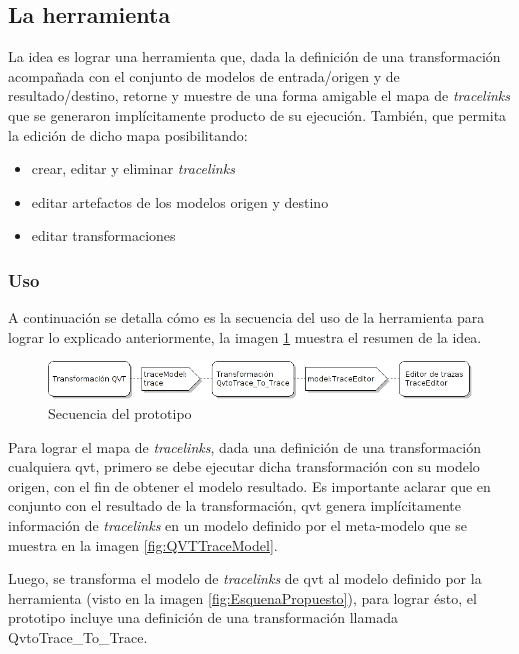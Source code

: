 \documentclass[a4paper,12pt,oneside,spanish]{book}
\begin{document}
\subsection{La herramienta}

La idea es lograr una herramienta que, dada la definición de una transformación acompañada con el conjunto de modelos de entrada/origen y de resultado/destino, retorne y muestre de una forma amigable el mapa de \textit{tracelinks} que se generaron implícitamente producto de su ejecución. También, que permita la edición de dicho mapa posibilitando:
\begin{itemize}
\item crear, editar y eliminar \textit{tracelinks}
\item editar artefactos de los modelos origen y destino
\item editar transformaciones
\end{itemize}


\subsubsection{Uso}

A continuación se detalla cómo es la secuencia del uso de la herramienta para lograr lo explicado anteriormente, la imagen \ref{fig:SecuenciaPrototipo} muestra el resumen de la idea.

\bigskip

\begin{figure}[hbtp]
\centering
\includegraphics[scale=.56]{./img/Secuencia_Prototipo}
\caption{Secuencia del prototipo}
\label{fig:SecuenciaPrototipo}
\end{figure}

\bigskip

Para lograr el mapa de \textit{tracelinks}, dada una definición de una transformación cualquiera \gls{qvt}, primero se debe ejecutar dicha transformación con su modelo origen, con el fin de obtener el modelo resultado. Es importante aclarar que en conjunto con el resultado de la transformación, \gls{qvt} genera implícitamente información de \textit{tracelinks} en un modelo definido por el meta-modelo que se muestra en la imagen \ref{fig:QVTTraceModel}. 

Luego, se transforma el modelo de \textit{tracelinks} de \gls{qvt} al modelo definido por la herramienta (visto en la imagen \ref{fig:EsquenaPropuesto}), para lograr ésto, el prototipo incluye una definición de una transformación llamada \textsf{QvtoTrace\_To\_Trace}.
\end{document}
